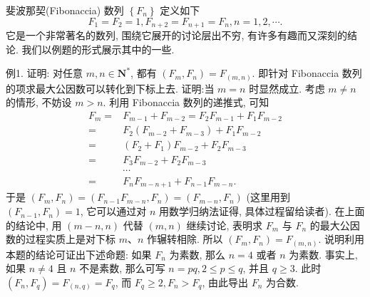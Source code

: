 
斐波那契(Fibonaccia) 数列 $\left\{F_n\right\}$ 定义如下
$$
F_1=F_2=1, F_{n+2}=F_{n+1}=F_n, n=1,2, \cdots .
$$
它是一个非常著名的数列, 围绕它展开的讨论层出不穷, 有许多有趣而又深刻的结论.
我们以例题的形式展示其中的一些.



例1. 证明: 对任意 $m, n \in \mathbf{N}^*$, 都有 $\left(F_m, F_n\right)=F_{(m, n)}$. 即针对 Fibonaccia 数列的项求最大公因数可以转化到下标上去.
证明:当 $m=n$ 时显然成立.
考虑 $m \neq n$ 的情形, 不妨设 $m>n$.
利用 Fibonaccia 数列的递推式, 可知
$$
\begin{aligned}
F_m= & F_{m-1}+F_{m-2}=F_2 F_{m-1}+F_1 F_{m-2} \\
= & F_2\left(F_{m-2}+F_{m-3}\right)+F_1 F_{m-2} \\
= & \left(F_2+F_1\right) F_{m-2}+F_2 F_{m-3} \\
= & F_3 F_{m-2}+F_2 F_{m-3} \\
& \cdots \\
= & F_n F_{m-n+1}+F_{n-1} F_{m-n} .
\end{aligned}
$$
于是 $\left(F_m, F_n\right)=\left(F_{n-1} F_{m-n}, F_n\right)=\left(F_{m-n}, F_n\right)$ (这里用到 $\left(F_{n-1}, F_n\right)=1$, 它可以通过对 $n$ 用数学归纳法证得, 具体过程留给读者).
在上面的结论中, 用 $(m-n, n)$ 代替 $(m, n)$ 继续讨论, 表明求 $F_m$ 与 $F_n$ 的最大公因数的过程实质上是对下标 $m 、 n$ 作辗转相除.
所以 $\left(F_m, F_n\right)= F_{(m, n)}$.
说明利用本题的结论可证出下述命题: 如果 $F_n$ 为素数, 那么 $n=4$ 或者 $n$ 为素数.
事实上, 如果 $n \neq 4$ 且 $n$ 不是素数, 那么可写 $n=p q, 2 \leqslant p \leqslant q$, 并且
$q \geqslant 3$. 此时 $\left(F_n, F_q\right)=F_{(n, q)}=F_q$, 而 $F_q \geqslant 2, F_n>F_q$, 由此导出 $F_n$ 为合数.



